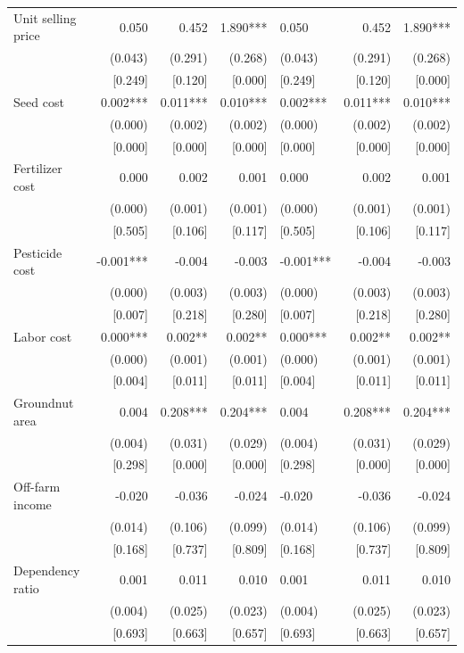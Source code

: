\documentclass[
]{article}
\begin{document}
\begin{ThreePartTable}
\begin{longtable}[t]{lrrrlrr}
Unit selling price & 0.050 & 0.452 & 1.890*** & 0.050 & 0.452 & 1.890***\\
 & (0.043) & (0.291) & (0.268) & (0.043) & (0.291) & (0.268)\\
 & {}[0.249] & {}[0.120] & {}[0.000] & {}[0.249] & {}[0.120] & {}[0.000]\\
Seed cost & 0.002*** & 0.011*** & 0.010*** & 0.002*** & 0.011*** & 0.010***\\
 & (0.000) & (0.002) & (0.002) & (0.000) & (0.002) & (0.002)\\
 & {}[0.000] & {}[0.000] & {}[0.000] & {}[0.000] & {}[0.000] & {}[0.000]\\
Fertilizer cost & 0.000 & 0.002 & 0.001 & 0.000 & 0.002 & 0.001\\
 & (0.000) & (0.001) & (0.001) & (0.000) & (0.001) & (0.001)\\
 & {}[0.505] & {}[0.106] & {}[0.117] & {}[0.505] & {}[0.106] & {}[0.117]\\
Pesticide cost & -0.001*** & -0.004 & -0.003 & -0.001*** & -0.004 & -0.003\\
 & (0.000) & (0.003) & (0.003) & (0.000) & (0.003) & (0.003)\\
 & {}[0.007] & {}[0.218] & {}[0.280] & {}[0.007] & {}[0.218] & {}[0.280]\\
Labor cost & 0.000*** & 0.002** & 0.002** & 0.000*** & 0.002** & 0.002**\\
 & (0.000) & (0.001) & (0.001) & (0.000) & (0.001) & (0.001)\\
 & {}[0.004] & {}[0.011] & {}[0.011] & {}[0.004] & {}[0.011] & {}[0.011]\\
Groundnut area & 0.004 & 0.208*** & 0.204*** & 0.004 & 0.208*** & 0.204***\\
 & (0.004) & (0.031) & (0.029) & (0.004) & (0.031) & (0.029)\\
 & {}[0.298] & {}[0.000] & {}[0.000] & {}[0.298] & {}[0.000] & {}[0.000]\\
Off-farm income & -0.020 & -0.036 & -0.024 & -0.020 & -0.036 & -0.024\\
 & (0.014) & (0.106) & (0.099) & (0.014) & (0.106) & (0.099)\\
 & {}[0.168] & {}[0.737] & {}[0.809] & {}[0.168] & {}[0.737] & {}[0.809]\\
Dependency ratio & 0.001 & 0.011 & 0.010 & 0.001 & 0.011 & 0.010\\
 & (0.004) & (0.025) & (0.023) & (0.004) & (0.025) & (0.023)\\
 & {}[0.693] & {}[0.663] & {}[0.657] & {}[0.693] & {}[0.663] & {}[0.657]\\

\end{longtable}
\end{ThreePartTable}
\end{document}
